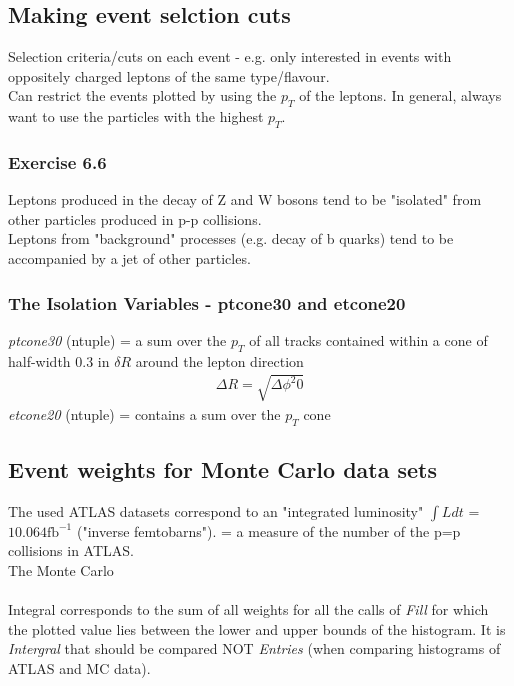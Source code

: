 \subsection{Making event selction cuts}
Selection criteria/cuts on each event - e.g. only interested in events with oppositely charged leptons of the same type/flavour.
\\
Can restrict the events plotted by using the $p_T$ of the leptons.
In general, always want to use the  particles with the highest $p_T$.

\subsubsection{Exercise 6.6}


Leptons produced in the decay of Z and W bosons tend to be "isolated" from other particles produced in p-p collisions.
\\
Leptons from "background" processes (e.g. decay of b quarks) tend to be accompanied by a jet of other particles.

\subsubsection{The Isolation Variables - ptcone30 and etcone20}
\textit{ptcone30} (ntuple)  = a sum over the $p_T$ of all tracks contained within a cone of half-width 0.3 in $\delta R$ around the lepton direction
\begin{align}
    \Delta R = \sqrt{\Delta \phi^2 0}
\end{align}
\textit{etcone20} (ntuple) = contains a sum over the $p_T$ cone


\subsection{Event weights for Monte Carlo data sets}
The used ATLAS datasets correspond to an "integrated luminosity" $\int L dt$ = $10.064 \text{fb}^{-1}$ ("inverse femtobarns").
= a measure of the number of the p=p collisions in ATLAS.
\\
The Monte Carlo
\\\\
Integral corresponds to the sum of all weights for all the calls of \textit{Fill} for which the plotted value lies between the lower and upper bounds of the histogram.
It is \textit{Intergral} that should be compared NOT \textit{Entries} (when comparing histograms of ATLAS and MC data).


